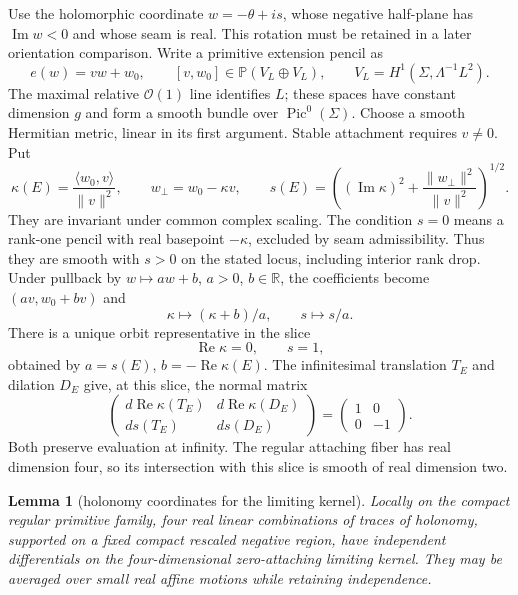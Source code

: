 \documentclass[11pt]{amsart}
\newtheorem{lemma}[theorem]{Lemma}
\theoremstyle{definition}
\theoremstyle{remark}
\theoremstyle{plain}
\begin{document}
Use the holomorphic coordinate $w=-\theta+is$, whose negative
half-plane has $\operatorname{Im}w<0$ and whose seam is real.
This rotation must be retained in a later orientation comparison.
Write a primitive extension pencil as
\[
 e(w)=vw+w_0,\qquad [v,w_0]\in\mathbb P(V_L\oplus V_L),
                       \qquad V_L=H^1(\Sigma,\Lambda^{-1}L^2).
\]
The maximal relative $\mathcal O(1)$ line identifies $L$;
these spaces have constant dimension $g$ and form a smooth bundle
over $\operatorname{Pic}^0(\Sigma)$. Choose a smooth Hermitian
metric, linear in its first argument. Stable attachment requires
$v\ne0$. Put
\begin{equation}\label{eq:gluing-affine-slice-functions}
 \kappa(E)=\frac{\langle w_0,v\rangle}{\|v\|^2},\qquad
 w_\perp=w_0-\kappa v,\qquad
 s(E)=\left((\operatorname{Im}\kappa)^2+
                          \frac{\|w_\perp\|^2}{\|v\|^2}\right)^{1/2}.
\end{equation}
They are invariant under common complex scaling. The condition $s=0$
means a rank-one pencil with real basepoint $-\kappa$, excluded
by seam admissibility. Thus they are smooth with $s>0$ on the
stated locus, including interior rank drop. Under pullback by
$w\mapsto aw+b$, $a>0$, $b\in\mathbb R$, the coefficients
become $(av,w_0+bv)$ and
\[
                         \kappa\longmapsto(\kappa+b)/a,
                              \qquad s\longmapsto s/a.
\]
There is a unique orbit representative in the slice
\begin{equation}\label{eq:gluing-affine-slice}
                            \operatorname{Re}\kappa=0,\qquad s=1,
\end{equation}
obtained by $a=s(E)$, $b=-\operatorname{Re}\kappa(E)$.
The infinitesimal translation $T_E$ and dilation $D_E$ give,
at this slice, the normal matrix
\begin{equation}\label{eq:gluing-affine-normal-matrix}
 \begin{pmatrix}
 d\operatorname{Re}\kappa(T_E)&d\operatorname{Re}\kappa(D_E)\\
 ds(T_E)&ds(D_E)
 \end{pmatrix}=\begin{pmatrix}1&0\\0&-1\end{pmatrix}.
\end{equation}
Both preserve evaluation at infinity. The regular attaching fiber
has real dimension four, so its intersection with this slice is
smooth of real dimension two.

\begin{lemma}[holonomy coordinates for the limiting kernel]
\label{lem:gluing-limiting-observations}
Locally on the compact regular primitive family, four real linear
combinations of traces of holonomy, supported on a fixed compact
rescaled negative region, have independent differentials on the
four-dimensional zero-attaching limiting kernel. They may be averaged
over small real affine motions while retaining independence.
\end{lemma}
\end{document}
